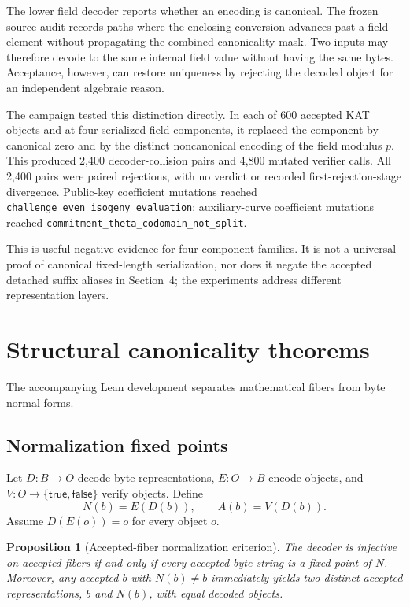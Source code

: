 \documentclass[11pt]{article}
\newtheorem{proposition}{Proposition}
\newcommand{\code}[1]{\texttt{#1}}
\begin{document}
The lower field decoder reports whether an encoding is canonical.  The frozen
source audit records paths where the enclosing conversion advances past a
field element without propagating the combined canonicality mask.  Two inputs
may therefore decode to the same internal field value without having the same
bytes.  Acceptance, however, can restore uniqueness by rejecting the decoded
object for an independent algebraic reason.

The campaign tested this distinction directly.  In each of 600 accepted KAT
objects and at four serialized field components, it replaced the component by
canonical zero and by the distinct noncanonical encoding of the field modulus
$p$.  This produced 2,400 decoder-collision pairs and 4,800 mutated verifier
calls.  All 2,400 pairs were paired rejections, with no verdict or recorded
first-rejection-stage divergence.  Public-key coefficient mutations reached
\code{challenge\_even\_isogeny\_evaluation}; auxiliary-curve coefficient
mutations reached \code{commitment\_theta\_codomain\_not\_split}.

This is useful negative evidence for four component families.  It is not a
universal proof of canonical fixed-length serialization, nor does it negate
the accepted detached suffix aliases in Section~4; the experiments address
different representation layers.

\section{Structural canonicality theorems}

The accompanying Lean development separates mathematical fibers from byte
normal forms.

\subsection{Normalization fixed points}

Let $D:B\to O$ decode byte representations, $E:O\to B$ encode objects, and
$V:O\to\{\mathsf{true},\mathsf{false}\}$ verify objects.  Define
\[
  N(b)=E(D(b)), \qquad A(b)=V(D(b)).
\]
Assume $D(E(o))=o$ for every object $o$.

\begin{proposition}[Accepted-fiber normalization criterion]
The decoder is injective on accepted fibers if and only if every accepted byte
string is a fixed point of $N$.  Moreover, any accepted $b$ with $N(b)\ne b$
immediately yields two distinct accepted representations, $b$ and $N(b)$,
with equal decoded objects.
\end{proposition}
\end{document}
